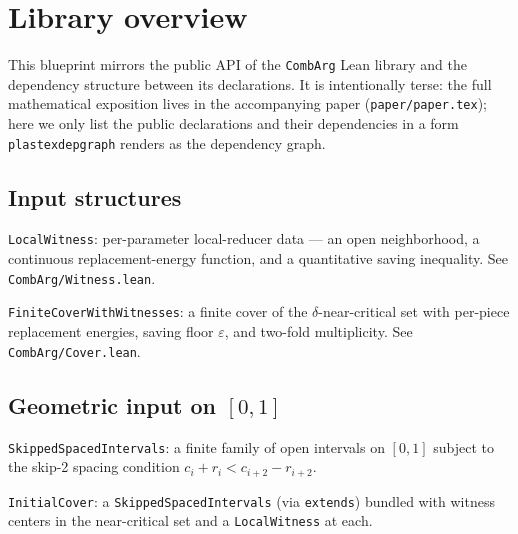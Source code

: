 \section{Library overview}

This blueprint mirrors the public API of the \texttt{CombArg}
Lean library and the dependency structure between its
declarations.  It is intentionally terse: the full mathematical
exposition lives in the accompanying paper
(\texttt{paper/paper.tex}); here we only list the public
declarations and their dependencies in a form
\texttt{plastexdepgraph} renders as the dependency graph.

\subsection{Input structures}

\begin{definition}
\label{def:local-witness}
\leanok
\texttt{LocalWitness}: per-parameter local-reducer data — an
open neighborhood, a continuous replacement-energy function, and
a quantitative saving inequality.  See
\texttt{CombArg/Witness.lean}.
\end{definition}

\begin{definition}
\label{def:cover}
\leanok
\texttt{FiniteCoverWithWitnesses}: a finite cover of the
$\delta$-near-critical set with per-piece replacement energies,
saving floor $\varepsilon$, and two-fold multiplicity.  See
\texttt{CombArg/Cover.lean}.
\end{definition}

\subsection{Geometric input on $[0,1]$}

\begin{definition}
\label{def:spaced}
\leanok
\texttt{SkippedSpacedIntervals}: a finite family of open
intervals on $[0,1]$ subject to the skip-2 spacing condition
$c_i + r_i < c_{i+2} - r_{i+2}$.
\end{definition}

\begin{definition}
\label{def:initial-cover}
\leanok
{}
\texttt{InitialCover}: a \texttt{SkippedSpacedIntervals} (via
\texttt{extends}) bundled with witness centers in the
near-critical set and a \texttt{LocalWitness} at each.
\end{definition}

